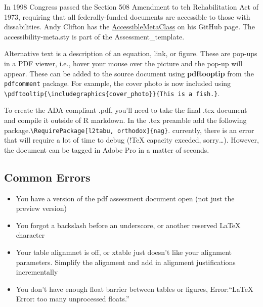 \documentclass[12pt,]{article}
\begin{document}
In 1998 Congress passed the Section 508 Amendment to teh Rehabilitation
Act of 1973, requiring that all federally-funded documents are
accessible to those with dissabilities. Andy Clifton has the
\href{https://github.com/AndyClifton/AccessibleMetaClass}{AccessibleMetaClass}
on his GitHub page. The accessibility-meta.sty is part of the
Assessment\_template.

Alternative text is a description of an equation, link, or figure. These
are pop-ups in a PDF viewer, i.e., hover your mouse over the picture and
the pop-up will appear. These can be added to the source document using
\textbf{pdftooptip} from the \texttt{pdfcomment} package. For example,
the cover photo is now included using
\texttt{\textbackslash{}pdftooltip\{\textbackslash{}includegraphics\{cover\_photo\}\}\{This\ is\ a\ fish.\}}.

To create the ADA compliant .pdf, you'll need to take the final .tex
document and compile it outside of R markdown. In the .tex preamble add
the following
package.\texttt{\textbackslash{}RequirePackage{[}l2tabu,\ orthodox{]}\{nag\}}.
currently, there is an error that will require a lot of time to debug
(!TeX capacity exceded, sorry\ldots{}). However, the document can be
tagged in Adobe Pro in a matter of seconds.

\subsection{Common Errors}\label{common-errors}

\begin{itemize}
\item
  You have a version of the pdf assessment document open (not just the
  preview version)
\item
  You forgot a backslash before an underscore, or another reserved LaTeX
  character
\item
  Your table alignmnet is off, or xtable just doesn't like your
  alignment parameters. Simplify the alignment and add in alignment
  justifications incrementally
\item
  You don't have enough float barrier between tables or figures,
  Error:``LaTeX Error: too many unprocessed floats.''
\end{itemize}
\end{document}
